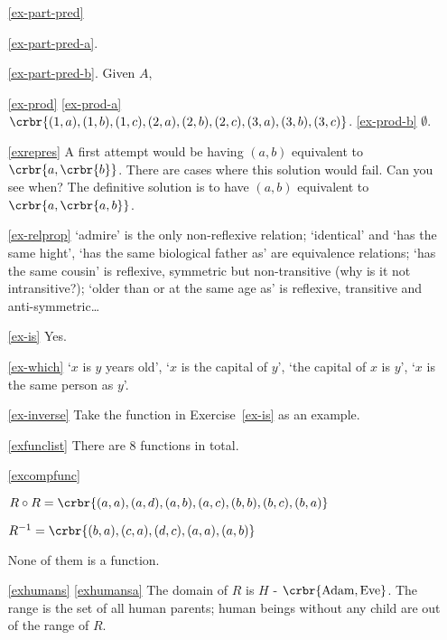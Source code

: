 \documentclass[11pt]{article}
\begin{document}
\begin{enumerate}
\item[\ref{ex-part-pred}]\hypertarget{ex-part-pred-sol}{}

\ref{ex-part-pred-a}. 

\ref{ex-part-pred-b}. Given $A$, 

\item[\ref{ex-prod}]\hypertarget{ex-prod-sol}{}
\ref{ex-prod-a} $\crbr{(1,a),(1,b),(1,c),(2,a),(2,b),(2,c),(3,a),(3,b),(3,c)}$.
\ref{ex-prod-b} $\emptyset$.

\item[\ref{exrepres}]\hypertarget{exrepressol}{} 
A first attempt would be having $(a,b)$ equivalent to
$\crbr{a,\crbr{b}}$. There are cases where this solution would fail. Can you see
when? The definitive solution is to have $(a,b)$ equivalent to
$\crbr{a,\crbr{a,b}}$.

\item[\ref{ex-relprop}]\hypertarget{ex-relprop-sol}{} `admire' is the only non-reflexive relation; `identical'
and `has the same hight', `has the same biological father as'  are equivalence
relations; `has the same cousin' is reflexive, symmetric but non-transitive (why
is it not intransitive?); `older than or at the same age as' is reflexive,
transitive and anti-symmetric\ldots

\item[\ref{ex-is}]\hypertarget{ex-is-sol}{} Yes.

\item[\ref{ex-which}]
 `$x$ is $y$ years old',
`$x$ is the capital of $y$', `the capital  of $x$ is $y$', `$x$ is the same person as $y$'.


\item[\ref{ex-inverse}] Take the function in Exercise~\ref{ex-is} as an example.

\item[\ref{exfunclist}]\hypertarget{exfunclistsol}{}
There are 8 functions in total.

\item[\ref{excompfunc}]\hypertarget{excompfuncsol}{}

$R\circ R = \crbr{(a,a),(a,d),(a,b),(a,c),(b,b),(b,c),(b,a)}$

	$R^{-1} = \crbr{(b,a),(c,a),(d,c),(a,a),(a,b)}$

None of them is a function.

\item[\ref{exhumans}]\hypertarget{exhumanssol}{}
\ref{exhumansa} The domain of $R$ is $H$ - $\crbr{\text{Adam},\text{Eve}}$. The range is the set
of all human parents; human beings without any child are 
out of the range of $R$.


\end{enumerate}
\end{document}
